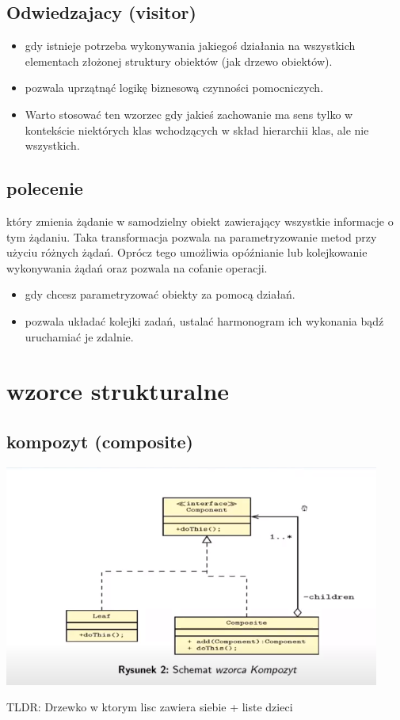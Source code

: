 \documentclass[11pt]{article}
\begin{document}
\subsection{Odwiedzajacy (visitor)}
\label{sec:org34f4679}
\begin{itemize}
\item gdy istnieje potrzeba wykonywania jakiegoś działania na wszystkich elementach złożonej struktury obiektów (jak drzewo obiektów).
\item pozwala uprzątnąć logikę biznesową czynności pomocniczych.
\item Warto stosować ten wzorzec gdy jakieś zachowanie ma sens tylko w kontekście niektórych klas wchodzących w skład hierarchii klas, ale nie wszystkich.
\end{itemize}
\subsection{polecenie}
\label{sec:org540a76a}
który zmienia żądanie w samodzielny obiekt zawierający wszystkie informacje o tym żądaniu. Taka transformacja pozwala na parametryzowanie metod przy użyciu różnych żądań. Oprócz tego umożliwia opóźnianie lub kolejkowanie wykonywania żądań oraz pozwala na cofanie operacji.
\begin{itemize}
\item gdy chcesz parametryzować obiekty za pomocą działań.
\item pozwala układać kolejki zadań, ustalać harmonogram ich wykonania bądź uruchamiać je zdalnie.
\end{itemize}
\section{wzorce strukturalne}
\label{sec:org3063d87}
\subsection{kompozyt (composite)}
\label{sec:orgb3ad3ec}
\begin{center}
\includegraphics[width=.9\linewidth]{./kompozyt.png}
\end{center}
TLDR: Drzewko w ktorym lisc zawiera siebie + liste dzieci
\end{document}

